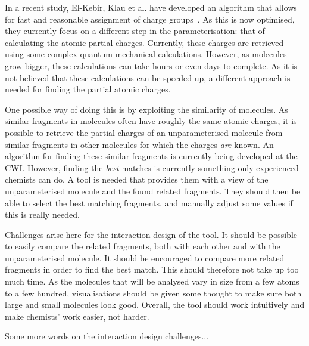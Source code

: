In a recent study, El-Kebir, Klau et al. have developed an algorithm that allows for fast and reasonable assignment of charge groups~\cite{canzar2012charge}. As this is now optimised, they currently focus on a different step in the parameterisation: that of calculating the atomic partial charges. Currently, these charges are retrieved using some complex quantum-mechanical calculations. However, as molecules grow bigger, these calculations can take hours or even days to complete. As it is not believed that these calculations can be speeded up, a different approach is needed for finding the partial atomic charges.

One possible way of doing this is by exploiting the similarity of molecules. As similar fragments in molecules often have roughly the same atomic charges, it is possible to retrieve the partial charges of an unparameterised molecule from similar fragments in other molecules for which the charges \emph{are} known. An algorithm for finding these similar fragments is currently being developed at the CWI. However, finding the \emph{best} matches is currently something only experienced chemists can do. A tool is needed that provides them with a view of the unparameterised molecule and the found related fragments. They should then be able to select the best matching fragments, and manually adjust some values if this is really needed.

Challenges arise here for the interaction design of the tool. It should be possible to easily compare the related fragments, both with each other and with the unparameterised molecule. It should be encouraged to compare more related fragments in order to find the best match. This should therefore not take up too much time. As the molecules that will be analysed vary in size from a few atoms to a few hundred, visualisations should be given some thought to make sure both large and small molecules look good. Overall, the tool should work intuitively and make chemists' work easier, not harder.

Some more words on the interaction design challenges...
